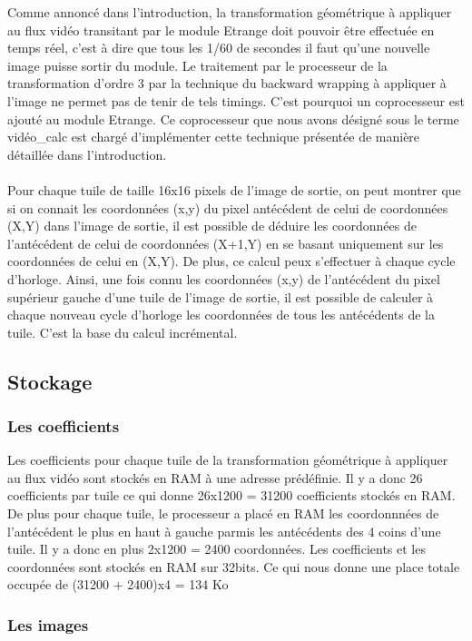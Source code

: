 \documentclass[a4paper,12pt]{report}
\begin{document}
{{Comme annoncé dans l'introduction, la transformation géométrique à appliquer au flux vidéo transitant par le module Etrange doit pouvoir être effectuée en temps réel, c'est à dire que tous les 1/60 de secondes il faut qu'une nouvelle image puisse sortir du module. Le traitement par le processeur de la transformation d'ordre 3 par la technique du backward wrapping  à appliquer à l'image ne permet pas de tenir de tels timings. C'est pourquoi un coprocesseur est ajouté au module Etrange. Ce coprocesseur que nous avons désigné sous le terme vidéo\_calc est chargé d'implémenter cette technique présentée de manière détaillée dans l'introduction.
\\
\\
Pour chaque tuile de taille 16x16 pixels de l'image de sortie, on peut montrer que si on connait les coordonnées (x,y) du pixel antécédent de celui de coordonnées (X,Y) dans l'image de sortie, il est possible de déduire les coordonnées de l'antécédent de celui de coordonnées (X+1,Y) en se basant uniquement sur les coordonnées de celui en (X,Y). De plus, ce calcul peux s'effectuer à chaque cycle d'horloge.
Ainsi, une fois connu les coordonnées (x,y) de l'antécédent du pixel supérieur gauche d'une tuile de l'image de sortie, il est possible de calculer à chaque nouveau cycle d'horloge les coordonnées de tous les antécédents de la tuile. C'est la base du calcul incrémental.

	\subsection{Stockage}

		\subsubsection*{Les coefficients}

Les coefficients pour chaque tuile de la transformation géométrique à appliquer au flux vidéo sont stockés en RAM à une adresse prédéfinie. Il y a donc 26 coefficients par tuile
ce qui donne 26x1200 = 31200 coefficients stockés en RAM. De plus pour chaque tuile, le processeur a placé en RAM les coordonnnées de l'antécédent le plus en haut à gauche parmis les antécédents des 4 coins d'une tuile. Il y a donc en plus 2x1200 = 2400 coordonnées.
Les coefficients et les coordonnées sont stockés en RAM sur 32bits. Ce qui nous donne une place totale occupée de (31200 + 2400)x4 = 134 Ko

	\subsubsection*{Les images}

}}
\end{document}
